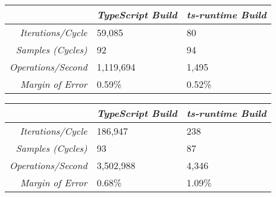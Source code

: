 \begin{center}
{
\centering
\tabulinesep=1.2mm
\setlength{\tabcolsep}{5mm}
\def\arraystretch{1.25}
\small
\begin{tabu} to \textwidth {|r||X[c,m]|X[c,m]|}
  \hline
  & \emph{TypeScript Build} & \emph{ts-runtime Build} \\
  \hline
  \hline
  \emph{Iterations/Cycle}  & 59,085 & 80 \\
  \hline
  \emph{Samples (Cycles)}  & 92 & 94 \\
  \hline
  \emph{Operations/Second} & 1,119,694 & 1,495 \\
  \hline
  \emph{Margin of Error}   & 0.59\% & 0.52\% \\
  \hline
\end{tabu}
}
\end{center}

\begin{center}
{
\centering
\tabulinesep=1.2mm
\setlength{\tabcolsep}{5mm}
\def\arraystretch{1.25}
\small
\begin{tabu} to \textwidth {|r||X[c,m]|X[c,m]|}
  \hline
  & \emph{TypeScript Build} & \emph{ts-runtime Build} \\
  \hline
  \hline
  \emph{Iterations/Cycle}  & 186,947 & 238 \\
  \hline
  \emph{Samples (Cycles)}  & 93 & 87 \\
  \hline
  \emph{Operations/Second} & 3,502,988 & 4,346 \\
  \hline
  \emph{Margin of Error}   & 0.68\% & 1.09\% \\
  \hline
\end{tabu}
}
\end{center}
